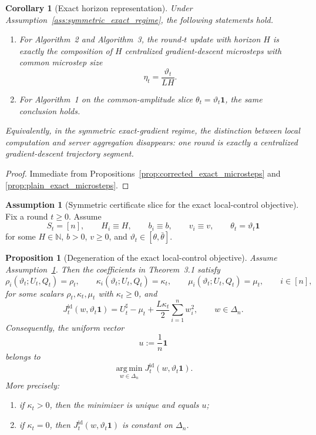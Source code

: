 \documentclass{article}
\newtheorem{proposition}[theorem]{Proposition}
\newtheorem{corollary}[theorem]{Corollary}
\theoremstyle{definition}
\newtheorem{assumption}[theorem]{Assumption}
\newcommand{\argmin}{\operatorname*{arg\,min}}
\newcommand{\one}{\mathbf 1}
\begin{document}
\begin{corollary}[Exact horizon representation]
\label{cor:exact_horizon_representation}
Under Assumption~\ref{ass:symmetric_exact_regime}, the following statements hold.

\begin{enumerate}[label=(\roman*)]
    \item For Algorithm~2 and Algorithm~3, the round-$t$ update with horizon $H$ is exactly the composition of $H$ centralized gradient-descent microsteps with common microstep size
    \[
    \eta_t = \frac{\vartheta_t}{LH}.
    \]
    \item For Algorithm~1 on the common-amplitude slice $\theta_t=\vartheta_t\one$, the same conclusion holds.
\end{enumerate}

Equivalently, in the symmetric exact-gradient regime, the distinction between local computation and server aggregation disappears: one round is exactly a centralized gradient-descent trajectory segment.
\end{corollary}

\begin{proof}
Immediate from Propositions~\ref{prop:corrected_exact_microsteps} and \ref{prop:plain_exact_microsteps}.
\end{proof}

\begin{assumption}[Symmetric certificate slice for the exact local-control objective]
\label{ass:symmetric_certificate_slice}
Fix a round $t \ge 0$. Assume
\[
S_t = [n],
\qquad
H_i \equiv H,
\qquad
b_i \equiv b,
\qquad
v_i \equiv v,
\qquad
\theta_t = \vartheta_t \one
\]
for some $H \in \mathbb{N}$, $b>0$, $v \ge 0$, and $\vartheta_t \in [\theta,\bar\theta]$.
\end{assumption}

\begin{proposition}[Degeneration of the exact local-control objective]
\label{prop:local_control_degeneration}
Assume Assumption~\ref{ass:symmetric_certificate_slice}. Then the coefficients in Theorem~3.1 satisfy
\[
\rho_i(\vartheta_t;U_t,Q_t) = \rho_t,
\qquad
\kappa_i(\vartheta_t;U_t,Q_t) = \kappa_t,
\qquad
\mu_i(\vartheta_t;U_t,Q_t) = \mu_t,
\qquad i \in [n],
\]
for some scalars $\rho_t,\kappa_t,\mu_t$ with $\kappa_t \ge 0$, and
\[
J_t^{\mathrm{id}}(w,\vartheta_t\one)
=
U_t^\sharp - \mu_t + \frac{L\kappa_t}{2}\sum_{i=1}^n w_i^2,
\qquad w \in \Delta_n.
\]
Consequently, the uniform vector
\[
u := \frac1n \one
\]
belongs to
\[
\argmin_{w \in \Delta_n} J_t^{\mathrm{id}}(w,\vartheta_t\one).
\]
More precisely:
\begin{enumerate}[label=(\roman*)]
    \item if $\kappa_t>0$, then the minimizer is unique and equals $u$;
    \item if $\kappa_t=0$, then $J_t^{\mathrm{id}}(w,\vartheta_t\one)$ is constant on $\Delta_n$.
\end{enumerate}
\end{proposition}
\end{document}
